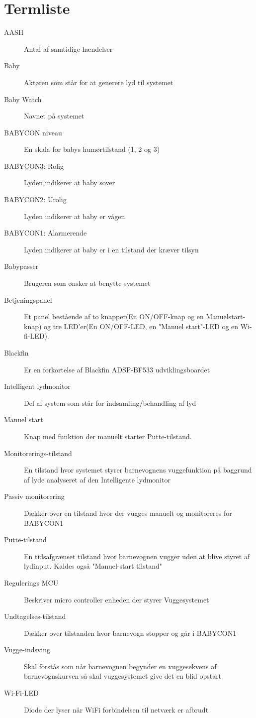 \chapter{Termliste}


\begin{description}
\item[AASH] Antal af samtidige hændelser
\item[Baby] Aktøren som står for at generere lyd til systemet
\item[Baby Watch] Navnet på systemet
\item[BABYCON niveau] En skala for babys humørtilstand (1, 2 og 3)
\item[BABYCON3: Rolig] Lyden indikerer at baby sover
\item[BABYCON2: Urolig] Lyden indikerer at baby er vågen
\item[BABYCON1: Alarmerende] Lyden indikerer at baby er i en tilstand der kræver tilsyn
\item[Babypasser] Brugeren som ønsker at benytte systemet
\item[Betjeningspanel]Et panel bestående af to knapper(En ON/OFF-knap og en Manuelstart-knap) og tre LED'er(En ON/OFF-LED, en "Manuel start"-LED og en Wi-fi-LED).
\item[Blackfin] Er en forkortelse af Blackfin ADSP-BF533 udviklingsboardet
\item[Intelligent lydmonitor] Del af system som står for indsamling/behandling af lyd
\item[Manuel start] Knap med funktion der manuelt starter Putte-tilstand.
\item[Monitorerings-tilstand] En tilstand hvor systemet styrer barnevognens vuggefunktion på baggrund af lyde analyseret af den Intelligente lydmonitor
\item[Passiv monitorering] Dækker over en tilstand hvor der vugges manuelt og monitoreres for BABYCON1
\item[Putte-tilstand] En tidsafgrænset tilstand hvor barnevognen vugger uden at blive styret af lydinput. Kaldes også "Manuel-start tilstand"
\item[Regulerings MCU] Beskriver micro controller enheden der styrer Vuggesystemet
\item[Undtagelses-tilstand] Dækker over tilstanden hvor barnevogn stopper og går i BABYCON1
\item[Vugge-indsving] Skal forstås som når barnevognen begynder en vuggesekvens af barnevognskurven så skal vuggesystemet give det en blid opstart
\item[Wi-Fi-LED]Diode der lyser når WiFi forbindelsen til netværk er afbrudt





\end{description}